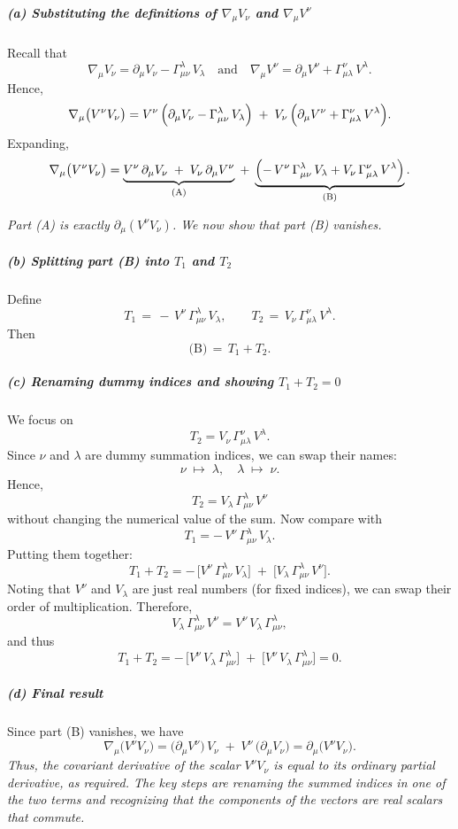 \documentclass{article}
\begin{document}
\subparagraph*{(a) Substituting the definitions of \(\nabla_\mu V_\nu\) and \(\nabla_\mu V^\nu\)}
Recall that
\[
\nabla_\mu V_\nu
=
\partial_\mu V_\nu
-
\Gamma^\lambda_{\mu\nu} \, V_\lambda
\quad\text{and}\quad
\nabla_\mu V^\nu
=
\partial_\mu V^\nu
+
\Gamma^\nu_{\mu\lambda} \, V^\lambda.
\]
Hence,
\[
\nabla_\mu \bigl(V^\nu V_\nu\bigr)
=
V^\nu \,\Bigl(\partial_\mu V_\nu - \Gamma^\lambda_{\mu\nu}\, V_\lambda\Bigr)
\;+\;
V_\nu \,\Bigl(\partial_\mu V^\nu + \Gamma^\nu_{\mu\lambda}\, V^\lambda\Bigr).
\]
Expanding,
\[
\nabla_\mu \bigl(V^\nu V_\nu\bigr)
=
\underbrace{V^\nu \,\partial_\mu V_\nu \;+\; V_\nu \,\partial_\mu V^\nu}_{\text{(A)}}
\;+\;
\underbrace{\Bigl(-\,V^\nu\,\Gamma^\lambda_{\mu\nu}\,V_\lambda + V_\nu\,\Gamma^\nu_{\mu\lambda}\,V^\lambda\Bigr)}_{\text{(B)}}.
\]

\emph{Part (A) is exactly \(\partial_\mu(V^\nu V_\nu)\). We now show that part (B) vanishes.}

\subparagraph*{(b) Splitting part (B) into \(T_1\) and \(T_2\)}
Define
\[
T_1
\,=\,
-\,V^\nu\,\Gamma^\lambda_{\mu\nu}\,V_\lambda,
\qquad
T_2
\,=\,
V_\nu\,\Gamma^\nu_{\mu\lambda}\,V^\lambda.
\]
Then
\[
\text{(B)}
\,=\,
T_1 + T_2.
\]

\subparagraph*{(c) Renaming dummy indices and showing \(T_1 + T_2 = 0\)}
We focus on
\[
T_2
=
V_\nu\,\Gamma^\nu_{\mu\lambda}\,V^\lambda.
\]
Since \(\nu\) and \(\lambda\) are dummy summation indices, we can swap their names:
\[
\nu \;\longmapsto\; \lambda,
\quad
\lambda \;\longmapsto\; \nu.
\]
Hence,
\[
T_2
=
V_\lambda \,\Gamma^\lambda_{\mu\nu}\,V^\nu
\]
without changing the numerical value of the sum. Now compare with
\[
T_1
=
-\,V^\nu \,\Gamma^\lambda_{\mu\nu}\,V_\lambda.
\]
Putting them together:
\[
T_1 + T_2
=
-\,\bigl[V^\nu \,\Gamma^\lambda_{\mu\nu}\,V_\lambda\bigr]
\;+\;
\bigl[V_\lambda \,\Gamma^\lambda_{\mu\nu}\,V^\nu\bigr].
\]
Noting that \(V^\nu\) and \(V_\lambda\) are just real numbers (for fixed indices), we can swap their order of multiplication. Therefore,
\[
V_\lambda \,\Gamma^\lambda_{\mu\nu}\,V^\nu
=
V^\nu\,V_\lambda\,\Gamma^\lambda_{\mu\nu},
\]
and thus
\[
T_1 + T_2
=
-\,\bigl[V^\nu\,V_\lambda\,\Gamma^\lambda_{\mu\nu}\bigr]
\;+\;
\bigl[V^\nu\,V_\lambda\,\Gamma^\lambda_{\mu\nu}\bigr]
=
0.
\]

\subparagraph*{(d) Final result}
Since part (B) vanishes, we have
\[
\nabla_\mu \bigl(V^\nu V_\nu\bigr)
=
\bigl(\partial_\mu V^\nu\bigr)\,V_\nu
\;+\;
V^\nu\,\bigl(\partial_\mu V_\nu\bigr)
=
\partial_\mu \bigl(V^\nu V_\nu\bigr).
\]
\emph{Thus, the covariant derivative of the scalar \(V^\nu V_\nu\) is equal to its ordinary partial derivative, as required. The key steps are renaming the summed indices in one of the two terms and recognizing that the components of the vectors are real scalars that commute.}
\end{document}
